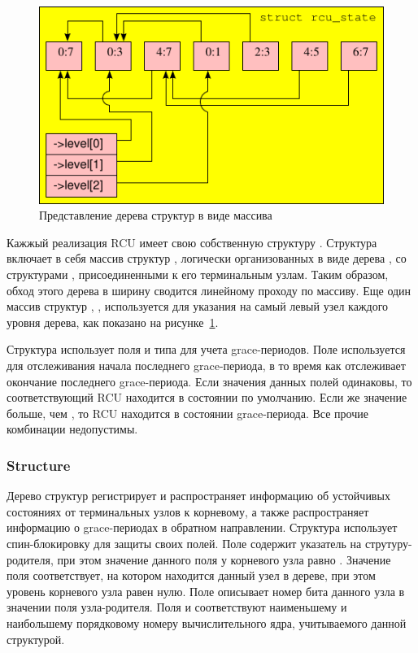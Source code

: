 \begin{figure}[tbp]
\centering
\includegraphics[scale=0.9]{rcu_node_array.pdf}
\caption{Представление дерева структур  в виде массива}
\label{fig:rcu_node_array}
\end{figure}

Кажжый реализация RCU имеет свою собственную структуру .
Структура  включает в себя массив структур ,
логически организованных в виде дерева
,
со структурами , присоединенными к его терминальным узлам.
Таким образом, обход этого дерева в ширину сводится линейному проходу по массиву.
Еще один массив структур , ,
используется для указания на самый левый узел каждого уровня дерева,
как показано на рисунке~\ref{fig:rcu_node_array}.

Структура  использует поля  и 
типа  для учета grace-периодов.
Поле  используется для отслеживания начала последнего grace-периода,
в то время как  отслеживает окончание последнего grace-периода.
Если значения данных полей одинаковы, то соответствующий RCU находится в состоянии
по умолчанию. Если же значение  больше, чем ,
то RCU находится в состоянии grace-периода.
Все прочие комбинации недопустимы.

\subsubsection{ Structure}
\label{sec:rcu_node}
Дерево структур  регистрирует и распространяет
информацию об устойчивых состояниях от терминальных узлов к корневому,
а также распространяет информацию о grace-периодах в обратном направлении.
%
Структура  использует спин-блокировку  для защиты
своих полей. Поле  содержит указатель на струтуру-родителя,
при этом значение данного поля у корневого узла равно .
Значение поля  соответствует, на котором находится данный
узел в дереве, при этом уровень корневого узла равен нулю.
Поле  описывает номер бита данного узла в значении поля
 узла-родителя.
Поля  и  соответствуют наименьшему и наибольшему
порядковому номеру вычислительного ядра, учитываемого данной структурой.

